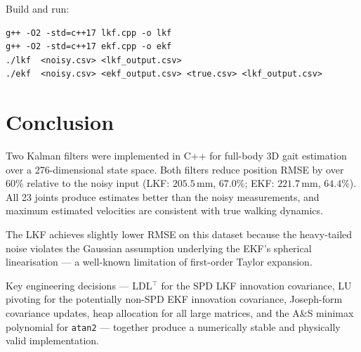 \documentclass[11pt, a4paper]{article}
\begin{document}
Build and run:
\begin{verbatim}
g++ -O2 -std=c++17 lkf.cpp -o lkf
g++ -O2 -std=c++17 ekf.cpp -o ekf
./lkf  <noisy.csv> <lkf_output.csv>
./ekf  <noisy.csv> <ekf_output.csv> <true.csv> <lkf_output.csv>
\end{verbatim}

\section{Conclusion}

Two Kalman filters were implemented in C++ for full-body 3D gait estimation over
a 276-dimensional state space. Both filters reduce position RMSE by over 60\%
relative to the noisy input (LKF: $205.5\,\text{mm}$, $67.0\%$; EKF:
$221.7\,\text{mm}$, $64.4\%$). All 23 joints produce estimates better than the
noisy measurements, and maximum estimated velocities are consistent with true
walking dynamics.

The LKF achieves slightly lower RMSE on this dataset because the heavy-tailed
noise violates the Gaussian assumption underlying the EKF's spherical
linearisation --- a well-known limitation of first-order Taylor expansion.

Key engineering decisions --- LDL$^\top$ for the SPD LKF innovation covariance,
LU pivoting for the potentially non-SPD EKF innovation covariance, Joseph-form
covariance updates, heap allocation for all large matrices, and the A\&S minimax
polynomial for \texttt{atan2} --- together produce a numerically stable and
physically valid implementation.
\end{document}
